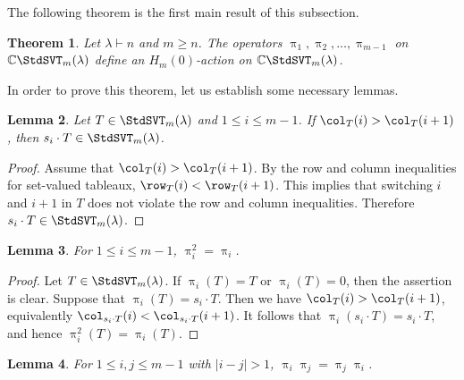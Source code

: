 \documentclass[12pt, reqno]{amsart}
\numberwithin{equation}{section}
\numberwithin{figure}{section}
\numberwithin{table}{section}
\newtheorem{theorem}{Theorem}[section]
\newtheorem{lemma}[theorem]{Lemma}
\theoremstyle{definition}
\def\C{\mathbb C}
\begin{document}
The following theorem is the first main result of this subsection.

\begin{theorem}\label{thm: svt action is 0hecke}
Let $\lambda \vdash n$ and $m\ge n$.
The operators $\uppi_1, \uppi_2, \ldots, \uppi_{m-1}$ on $\C \StdSVT_m(\lambda)$ define an $H_m(0)$-action on $\C \StdSVT_m(\lambda)$.
\end{theorem}

In order to prove this theorem, let us establish some necessary lemmas.


\begin{lemma}\label{lem: admissible swap}
Let $T\in\StdSVT_m(\lambda)$ and $1 \le i \le m-1$. 
If $\col_T(i)>\col_T(i+1)$, then $s_i\cdot T\in\StdSVT_m(\lambda)$.
\end{lemma}

\begin{proof}
Assume that $\col_T(i)>\col_T(i+1)$.
By the row and column inequalities for set-valued tableaux, $\row_T(i)<\row_T(i+1)$.
This implies that switching $i$ and $i+1$ in $T$ does not violate the row and column inequalities.
Therefore $s_i\cdot T\in\StdSVT_m(\lambda)$.
\end{proof}


\begin{lemma}\label{lem: svt action idempotence}
For $1\le i\le m-1$, $\uppi_i^2=\uppi_i$.
\end{lemma}

\begin{proof}
Let $T\in\StdSVT_m(\lambda)$.
If $\uppi_i(T)=T$ or $\uppi_i(T)=0$, then the assertion is clear.
Suppose that $\uppi_i(T)=s_i\cdot T$.
Then we have $\col_T(i) > \col_T(i+1)$, equivalently $\col_{s_i\cdot T}(i)<\col_{s_i\cdot T}(i+1)$.
It follows that $\uppi_i(s_i\cdot T)=s_i\cdot T$, and hence $\uppi_i^2(T)=\uppi_i(T)$.
\end{proof}


\begin{lemma}\label{lem: svt action commutation}
For $1\le i,j\le m-1$ with $|i-j|>1$, $\uppi_i\uppi_j=\uppi_j\uppi_i$.
\end{lemma}
\end{document}
